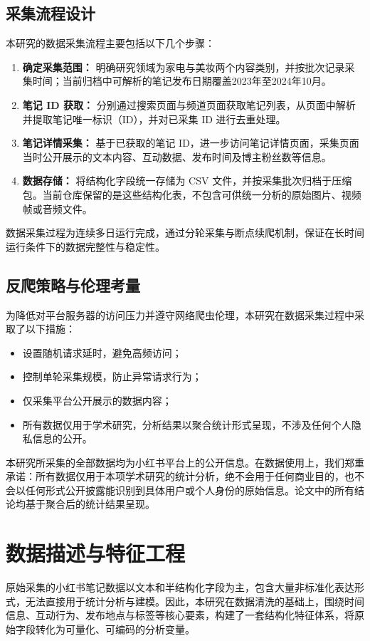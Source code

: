 \subsection{采集流程设计}
本研究的数据采集流程主要包括以下几个步骤：
\begin{enumerate}
	\item \textbf{确定采集范围：} 明确研究领域为家电与美妆两个内容类别，并按批次记录采集时间；当前归档中可解析的笔记发布日期覆盖2023年至2024年10月。
	\item \textbf{笔记 ID 获取：} 分别通过搜索页面与频道页面获取笔记列表，从页面中解析并提取笔记唯一标识（ID），并对已采集 ID 进行去重处理。
	\item \textbf{笔记详情采集：} 基于已获取的笔记 ID，进一步访问笔记详情页面，采集页面当时公开展示的文本内容、互动数据、发布时间及博主粉丝数等信息。
	\item \textbf{数据存储：} 将结构化字段统一存储为 CSV 文件，并按采集批次归档于压缩包。当前仓库保留的是这些结构化表，不包含可供统一分析的原始图片、视频帧或音频文件。
\end{enumerate}
数据采集过程为连续多日运行完成，通过分轮采集与断点续爬机制，保证在长时间运行条件下的数据完整性与稳定性。

\subsection{反爬策略与伦理考量}
为降低对平台服务器的访问压力并遵守网络爬虫伦理，本研究在数据采集过程中采取了以下措施：
\begin{itemize}
	\item 设置随机请求延时，避免高频访问；
	\item 控制单轮采集规模，防止异常请求行为；
	\item 仅采集平台公开展示的数据内容；
	\item 所有数据仅用于学术研究，分析结果以聚合统计形式呈现，不涉及任何个人隐私信息的公开。
\end{itemize}本研究所采集的全部数据均为小红书平台上的公开信息。在数据使用上，我们郑重承诺：所有数据仅用于本项学术研究的统计分析，绝不会用于任何商业目的，也不会以任何形式公开披露能识别到具体用户或个人身份的原始信息。论文中的所有结论均基于聚合后的统计结果呈现。

\section{数据描述与特征工程}

原始采集的小红书笔记数据以文本和半结构化字段为主，包含大量非标准化表达形式，无法直接用于统计分析与建模。因此，本研究在数据清洗的基础上，围绕时间信息、互动行为、发布地点与标签等核心要素，构建了一套结构化特征体系，将原始字段转化为可量化、可编码的分析变量。

